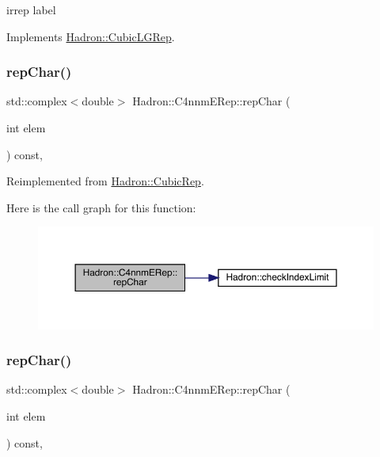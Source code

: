 irrep label 

Implements \mbox{\hyperlink{structHadron_1_1CubicLGRep_a50f5ddbb8f4be4cee0106fa9e8c75e6c}{Hadron\+::\+Cubic\+L\+G\+Rep}}.

\mbox{\label{structHadron_1_1C4nnmERep_af3cb7f743630f5a14e38a10ee61dc9ff}} 
\subsubsection{\texorpdfstring{repChar()}{repChar()}\hspace{0.1cm}{\footnotesize\ttfamily [1/2]}}
{\footnotesize\ttfamily std\+::complex$<$double$>$ Hadron\+::\+C4nnm\+E\+Rep\+::rep\+Char (\begin{DoxyParamCaption}\item[{int}]{elem }\end{DoxyParamCaption}) const\hspace{0.3cm}{\ttfamily [inline]}, {\ttfamily [virtual]}}



Reimplemented from \mbox{\hyperlink{structHadron_1_1CubicRep_af45227106e8e715e84b0af69cd3b36f8}{Hadron\+::\+Cubic\+Rep}}.

Here is the call graph for this function\+:
\nopagebreak
\begin{figure}[H]
\begin{center}
\leavevmode
\includegraphics[width=350pt]{dc/d30/structHadron_1_1C4nnmERep_af3cb7f743630f5a14e38a10ee61dc9ff_cgraph}
\end{center}
\end{figure}
\mbox{\label{structHadron_1_1C4nnmERep_af3cb7f743630f5a14e38a10ee61dc9ff}} 
\subsubsection{\texorpdfstring{repChar()}{repChar()}\hspace{0.1cm}{\footnotesize\ttfamily [2/2]}}
{\footnotesize\ttfamily std\+::complex$<$double$>$ Hadron\+::\+C4nnm\+E\+Rep\+::rep\+Char (\begin{DoxyParamCaption}\item[{int}]{elem }\end{DoxyParamCaption}) const\hspace{0.3cm}{\ttfamily [inline]}, {\ttfamily [virtual]}}



